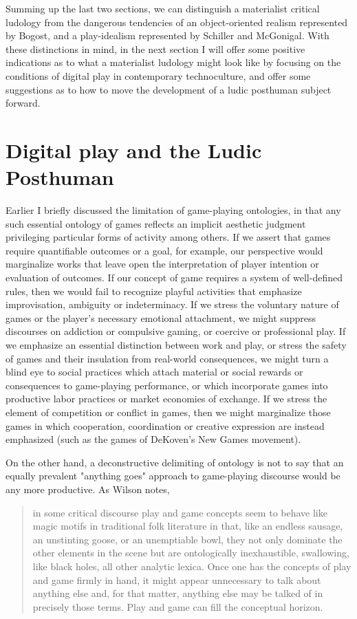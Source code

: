 Summing up the last two sections, we can distinguish a materialist critical ludology from the dangerous tendencies of an object-oriented realism represented by Bogost, and a play-idealism represented by Schiller and McGonigal. With these distinctions in mind, in the next section I will offer some positive indications as to what a materialist ludology might look like by focusing on the conditions of digital play in contemporary technoculture, and offer some suggestions as to how to move the development of a ludic posthuman subject forward.

\section{Digital play and the Ludic Posthuman}
Earlier I briefly discussed the limitation of game-playing ontologies, in that any such essential ontology of games reflects an implicit aesthetic judgment privileging particular forms of activity among others. If we assert that games require quantifiable outcomes or a goal, for example, our perspective would marginalize works that leave open the interpretation of player intention or evaluation of outcomes. If our concept of game requires a system of well-defined rules, then we would fail to recognize playful activities that emphasize improvisation, ambiguity or indeterminacy. If we stress the voluntary nature of games or the player's necessary emotional attachment, we might suppress discourses on addiction or compulsive gaming, or coercive or professional play. If we emphasize an essential distinction between work and play, or stress the safety of games and their insulation from real-world consequences, we might turn a blind eye to social practices which attach material or social rewards or consequences to game-playing performance, or which incorporate games into productive labor practices or market economies of exchange. If we stress the element of competition or conflict in games, then we might marginalize those games in which cooperation, coordination or creative expression are instead emphasized (such as the games of DeKoven's New Games movement).

On the other hand, a deconstructive delimiting of ontology is not to say that an equally prevalent "anything goes" approach to game-playing discourse would be any more productive. As Wilson notes, \blockquote{
  in some critical discourse play and game concepts seem to behave like magic motifs in traditional folk literature in that, like an endless sausage, an unstinting goose, or an unemptiable bowl, they not only dominate the other elements in the scene but are ontologically inexhaustible, swallowing, like black holes, all other analytic lexica. Once one has the concepts of play and game firmly in hand, it might appear unnecessary to talk about anything else and, for that matter, anything else may be talked of in precisely those terms. Play and game can fill the conceptual horizon. \autocite*[7]{Wilson1990-eu}
}

